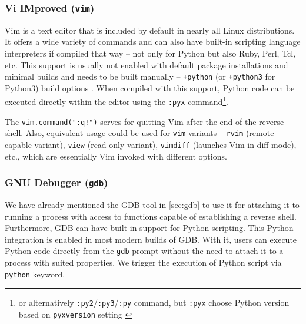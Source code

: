 \subsubsection{Vi IMproved (\texttt{vim})}


Vim is a text editor that is included by default in nearly all Linux distributions. It offers a wide variety of commands and can also have built-in scripting language interpreters if compiled that way -- not only for Python but also Ruby, Perl, Tcl, etc. This support is usually not enabled with default package installations and minimal builds and needs to be built manually -- \texttt{+python} (or \texttt{+python3} for Python3) build options \cite{vim-python-docs}. When compiled with this support, Python code can be executed directly within the editor using the \texttt{:pyx} command\footnote{or alternatively \texttt{:py2}/\texttt{:py3}/\texttt{:py} command, but \texttt{:pyx} choose Python version based on \texttt{pyxversion} setting \cite{vim-python-docs}}.


The \texttt{vim.command(":q!")} serves for quitting Vim after the end of the reverse shell. Also, equivalent usage could be used for \texttt{vim} variants -- \texttt{rvim} (remote-capable variant), \texttt{view} (read-only variant), \texttt{vimdiff} (launches Vim in diff mode), etc., which are essentially Vim invoked with different options.


\subsubsection{GNU Debugger (\texttt{gdb})}


We have already mentioned the GDB tool in \cref{sec:gdb} to use it for attaching it to running a process with access to functions capable of establishing a reverse shell. Furthermore, GDB can have built-in support for Python scripting. This Python integration is enabled in most modern builds of GDB. With it, users can execute Python code directly from the \texttt{gdb} prompt \cite{gdb-python-docs} without the need to attach it to a process with suited properties. We trigger the execution of Python script via \texttt{python} keyword.



